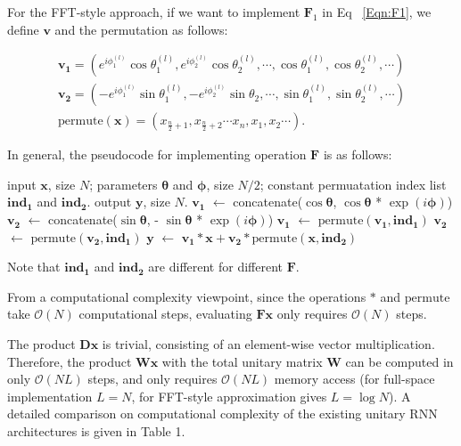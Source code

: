 For the FFT-style approach, if we want to implement $\mathbf{F}_1$ in Eq ~\ref{Eqn:F1}, we define $\mathbf{v}$ and the permutation as follows:

\begin{eqnarray*}
\mathbf{v_1} = (e^{i\phi_1^{(l)}}\cos\theta_1^{(l)}, e^{i\phi_2^{(l)}}\cos\theta_2^{(l)}, \cdots, \cos\theta_1^{(l)}, \cos\theta_2^{(l)}, \cdots)\\
\mathbf{v_2} = (-e^{i\phi_1^{(l)}}\sin\theta_1^{(l)}, -e^{i\phi_2^{(l)}}\sin\theta_2, \cdots, \sin\theta_1^{(l)}, \sin\theta_2^{(l)}, \cdots)\\
\mathrm{permute}(\mathbf{x}) = (x_{\frac{n}{2}+1}, x_{\frac{n}{2}+2} \cdots x_{n}, x_1, x_2 \cdots).
\end{eqnarray*}

In general, the pseudocode for implementing operation $\mathbf{F}$ is as follows:

\begin{algorithm}[h!]
   \caption{Efficient implementation for $\mathbf{F}$ with parameter $\theta_i$ and $\phi_i$.}
   \label{alg:example}
\begin{algorithmic}[h!]
    input $\mathbf{x}$, size $N$; parameters $\mathbf{\theta}$ and $\mathbf{\phi}$, size $N/2$; constant permuatation index list $\mathbf{ind_1}$ and $\mathbf{ind_2}$.
    output $\mathbf{y}$, size $N$.
   \STATE $\mathbf{v_1}$ $\leftarrow$ concatenate($\cos\mathbf{\theta}$, $\cos\mathbf{\theta}$ * $\exp(i\mathbf{\phi})$)
   \STATE $\mathbf{v_2}$ $\leftarrow$ concatenate($\sin\mathbf{\theta}$, - $\sin\mathbf{\theta}$ * $\exp(i\mathbf{\phi})$)
   \STATE $\mathbf{v_1}$ $\leftarrow$ $\mathrm{permute}(\mathbf{v_1}, \mathbf{ind_1})$
   \STATE $\mathbf{v_2}$ $\leftarrow$ $\mathrm{permute}(\mathbf{v_2}, \mathbf{ind_1})$
   \STATE $\mathbf{y}$ $\leftarrow$ $\mathbf{v_1} * \mathbf{x} + \mathbf{v_2} * \mathrm{permute}(\mathbf{x}, \mathbf{ind_2})$

\end{algorithmic}
\end{algorithm}

Note that $\mathbf{ind_1}$ and $\mathbf{ind_2}$ are different for different $\mathbf{F}$.

From a computational complexity viewpoint, since the operations $*$ and $\mathrm{permute}$ take $\mathcal{O}(N)$ computational steps, evaluating $\mathbf{F}\mathbf{x}$ only requires $\mathcal{O}(N)$ steps. 

The product $\mathbf{D}\mathbf{x}$ is trivial, consisting of an element-wise vector multiplication. Therefore, the product $\mathbf{W}\mathbf{x}$ with the total unitary matrix $\mathbf{W}$ can be computed in only $\mathcal{O}(NL)$  steps, and only requires $\mathcal{O}(NL)$ memory access (for full-space implementation $L=N$, for FFT-style approximation gives $L=\log N$). A detailed comparison on computational complexity of the existing unitary RNN architectures is given in Table 1.


